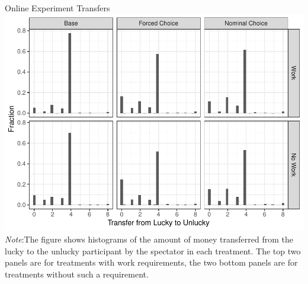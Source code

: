 \documentclass{beamer}
\begin{document}
\begin{frame}{Online Experiment Transfers}
	\includegraphics[height=.7\textheight]{../graphs/histograms_kantar_wd.pdf}
	{\tiny
	\emph{Note}:The figure shows histograms of the amount of money transferred from the lucky to
	the unlucky participant by the spectator in each treatment. The top two panels are for treatments
	with work requirements, the two bottom panels are for treatments without such a requirement.}
\end{frame}
\end{document}
